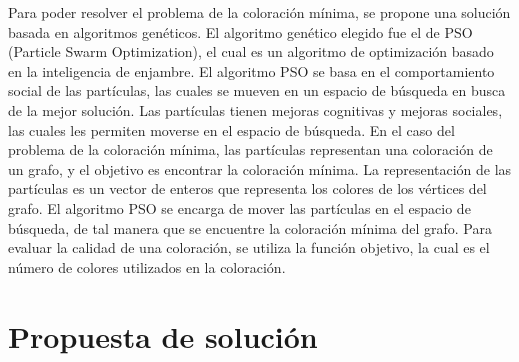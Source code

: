 \documentclass[9pt,a4paper,twoside]{tau-class/tau}
\begin{document}
    Para poder resolver el problema de la coloración mínima, se propone una solución basada en algoritmos genéticos.
    El algoritmo genético elegido fue el de PSO (Particle Swarm Optimization), el cual es un algoritmo de optimización basado en la inteligencia de enjambre.
    El algoritmo PSO se basa en el comportamiento social de las partículas, las cuales se mueven en un espacio de búsqueda en busca de la mejor solución.
    Las partículas tienen mejoras cognitivas y mejoras sociales, las cuales les permiten moverse en el espacio de búsqueda.
    En el caso del problema de la coloración mínima, las partículas representan una coloración de un grafo, y el objetivo es encontrar la coloración mínima.
    La representación de las partículas es un vector de enteros que representa los colores de los vértices del grafo.
    El algoritmo PSO se encarga de mover las partículas en el espacio de búsqueda, de tal manera que se encuentre la coloración mínima del grafo.
    Para evaluar la calidad de una coloración, se utiliza la función objetivo, la cual es el número de colores utilizados en la coloración.

\section{Propuesta de solución}
    
\end{document}

